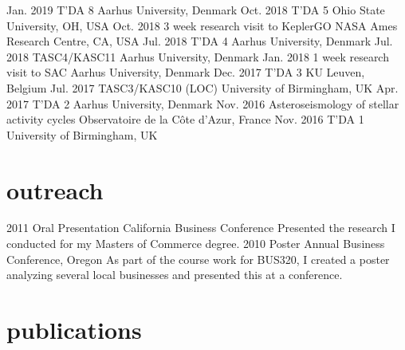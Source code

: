 \documentclass[]{k-cv} %
\begin{document}
\begin{entrylist}
\entrythree
{Jan. 2019}
{T'DA 8}
{Aarhus University, Denmark}
\entrythree
{Oct. 2018}
{T'DA 5}
{Ohio State University, OH, USA}
\entrythree
{Oct. 2018}
{3 week research visit to KeplerGO}
{NASA Ames Research Centre, CA, USA}
\entrythree
{Jul. 2018}
{T'DA 4}
{Aarhus University, Denmark}
\entrythree
{Jul. 2018}
{TASC4/KASC11}
{Aarhus University, Denmark}
\entrythree
{Jan. 2018}
{1 week research visit to SAC}
{Aarhus University, Denmark}
\entrythree
{Dec. 2017}
{T'DA 3}
{KU Leuven, Belgium}
\entrythree
{Jul. 2017}
{TASC3/KASC10 (LOC)}
{University of Birmingham, UK}
\entrythree
{Apr. 2017}
{T'DA 2}
{Aarhus University, Denmark}
\entrythree
{Nov. 2016}
{Asteroseismology of stellar activity cycles}
{Observatoire de la C\^{o}te d'Azur, France}
\entrythree
{Nov. 2016}
{T'DA 1}
{University of Birmingham, UK}
\end{entrylist}

\section{outreach}

\begin{entrylist}
\entry
{2011}
{Oral Presentation}
{California Business Conference}
{Presented the research I conducted for my Masters of Commerce degree.}
\entry
{2010}
{Poster}
{Annual Business Conference, Oregon}
{As part of the course work for BUS320, I created a poster analyzing several 
local businesses and presented this at a conference.}
\end{entrylist}


\section{publications}
\end{document}
